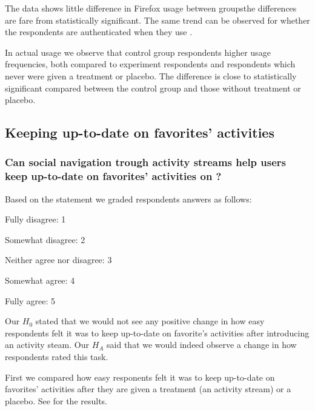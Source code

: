The data shows little difference in Firefox usage between
groups\dash{}the differences are
fare from statistically significant. The same trend can be observed for
whether the respondents are authenticated when they use \urort{}.

In actual \urort{} usage we observe that control group respondents higher
usage frequencies, both compared to experiment respondents and respondents
which never were given a treatment or placebo. The difference is close
to statistically significant compared between the control group and those
without treatment or placebo.

\subsection{Keeping up-to-date on favorites' activities}

\subsubsection{%
  Can social navigation trough activity streams help users keep
  up-to-date on favorites' activities on \urort{}?
}

Based on the statement
 we graded respondents answers as follows: 

\begin{items}
  \item Fully disagree: 1
  \item Somewhat disagree: 2
  \item Neither agree nor disagree: 3
  \item Somewhat agree: 4
  \item Fully agree: 5
\end{items}

Our $H_0$ stated that we would not see any positive change in how easy
respondents felt it was to keep up-to-date on favorite's activities
after introducing an activity steam. Our $H_A$ said that we
would indeed observe a change in how respondents rated this task.

First we compared how easy responents felt it was to keep up-to-date on
favorites' activities after they are given a treatment (an activity stream)
or a placebo.
See
 for the results.

